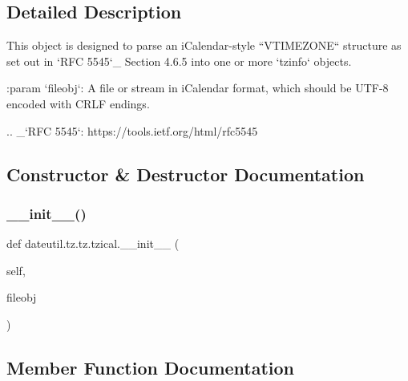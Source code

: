 \subsection{Detailed Description}
\begin{DoxyVerb}This object is designed to parse an iCalendar-style ``VTIMEZONE`` structure
as set out in `RFC 5545`_ Section 4.6.5 into one or more `tzinfo` objects.

:param `fileobj`:
    A file or stream in iCalendar format, which should be UTF-8 encoded
    with CRLF endings.

.. _`RFC 5545`: https://tools.ietf.org/html/rfc5545
\end{DoxyVerb}
 

\subsection{Constructor \& Destructor Documentation}
\mbox{\label{classdateutil_1_1tz_1_1tz_1_1tzical_ab63dc4cae6ef16d7c738c3cc56d8136b}} 
\subsubsection{\texorpdfstring{\+\_\+\+\_\+init\+\_\+\+\_\+()}{\_\_init\_\_()}}
{\footnotesize\ttfamily def dateutil.\+tz.\+tz.\+tzical.\+\_\+\+\_\+init\+\_\+\+\_\+ (\begin{DoxyParamCaption}\item[{}]{self,  }\item[{}]{fileobj }\end{DoxyParamCaption})}



\subsection{Member Function Documentation}
\mbox{\label{classdateutil_1_1tz_1_1tz_1_1tzical_aafd14c1858e6721546e85648f1415899}} 
